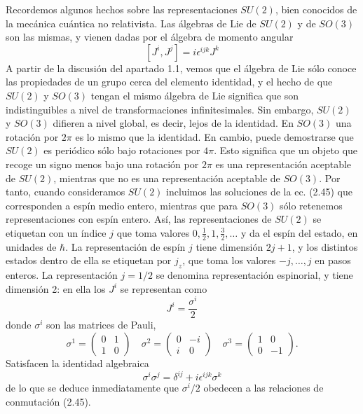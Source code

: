 Recordemos algunos hechos sobre las representaciones $S U(2)$, bien conocidos de la mecánica cuántica no relativista. Las álgebras de Lie de $S U(2)$ y de $S O(3)$ son las mismas, y vienen dadas por el álgebra de momento angular
\begin{equation*}
  \left[J^{i}, J^{j}\right]=i \epsilon^{i j k} J^{k} \tag{2.45}
  \end{equation*}
  A partir de la discusión del apartado 1.1, vemos que el álgebra de Lie sólo conoce las propiedades de un grupo cerca del elemento identidad, y el hecho de que $S U(2)$ y $S O(3)$ tengan el mismo álgebra de Lie significa que son indistinguibles a nivel de transformaciones infinitesimales. Sin embargo, $S U(2)$ y $S O(3)$ difieren a nivel global, es decir, lejos de la identidad. En $S O(3)$ una rotación por $2 \pi$ es lo mismo que la identidad. En cambio, puede demostrarse que $S U(2)$ es periódico sólo bajo rotaciones por $4 \pi$. Esto significa que un objeto que recoge un signo menos bajo una rotación por $2 \pi$ es una representación aceptable de $S U(2)$, mientras que no es una representación aceptable de $S O(3)$. Por tanto, cuando consideramos $S U(2)$ incluimos las soluciones de la ec. (2.45) que corresponden a espín medio entero, mientras que para $S O(3)$ sólo retenemos representaciones con espín entero. Así, las representaciones de $S U(2)$ se etiquetan con un índice $j$ que toma valores $0, \frac{1}{2}, 1, \frac{3}{2}, \ldots$ y da el espín del estado, en unidades de $\hbar$. La representación de espín $j$ tiene dimensión $2 j+1$, y los distintos estados dentro de ella se etiquetan por $j_{z}$, que toma los valores $-j, \ldots, j$ en pasos enteros. La representación $j=1 / 2$ se denomina representación espinorial, y tiene dimensión 2: en ella los $J^{i}$ se representan como
  \begin{equation*}
    J^{i}=\frac{\sigma^{i}}{2} \tag{2.46}
    \end{equation*}
    donde $\sigma^{i}$ son las matrices de Pauli, 
    $$
\sigma^{1}=\left(\begin{array}{cc}
0 & 1  \tag{2.47}\\
1 & 0
\end{array}\right) \quad \sigma^{2}=\left(\begin{array}{cc}
0 & -i \\
i & 0
\end{array}\right) \quad \sigma^{3}=\left(\begin{array}{cc}
1 & 0 \\
0 & -1
\end{array}\right) .
$$
Satisfacen la identidad algebraica
\begin{equation*}
  \sigma^{i} \sigma^{j}=\delta^{i j}+i \epsilon^{i j k} \sigma^{k} \tag{2.48}
  \end{equation*}
  de lo que se deduce inmediatamente que $\sigma^{i} / 2$ obedecen a las relaciones de conmutación (2.45).

